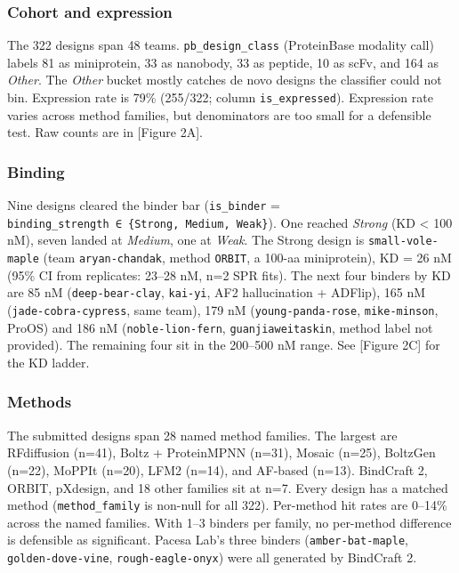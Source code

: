 \hypertarget{cohort-and-expression}{%
\subsubsection{Cohort and expression}\label{cohort-and-expression}}

The 322 designs span 48 teams. \texttt{pb\_design\_class} (ProteinBase
modality call) labels 81 as miniprotein, 33 as nanobody, 33 as peptide,
10 as scFv, and 164 as \emph{Other}. The \emph{Other} bucket mostly
catches de novo designs the classifier could not bin. Expression rate
is 79\% (255/322; column \texttt{is\_expressed}). Expression rate varies
across method families, but denominators are too small for a defensible
test. Raw counts are in {[}Figure 2A{]}.

\hypertarget{binding}{%
\subsubsection{Binding}\label{binding}}

Nine designs cleared the binder bar (\texttt{is\_binder} =
\texttt{binding\_strength\ ∈\ \{Strong,\ Medium,\ Weak\}}). One reached
\emph{Strong} (KD \textless{} 100 nM), seven landed at \emph{Medium},
one at \emph{Weak}. The Strong design is \texttt{small-vole-maple}
(team \texttt{aryan-chandak}, method \texttt{ORBIT}, a 100-aa
miniprotein), KD = 26 nM (95\% CI from replicates: 23--28 nM, n=2 SPR
fits). The next four binders by KD are 85 nM
(\texttt{deep-bear-clay}, \texttt{kai-yi}, AF2 hallucination + ADFlip),
165 nM (\texttt{jade-cobra-cypress}, same team), 179 nM
(\texttt{young-panda-rose}, \texttt{mike-minson}, ProOS) and 186 nM
(\texttt{noble-lion-fern}, \texttt{guanjiaweitaskin}, method label not
provided). The remaining four sit in the 200--500 nM range. See
{[}Figure 2C{]} for the KD ladder.

\hypertarget{methods}{%
\subsubsection{Methods}\label{methods}}

The submitted designs span 28 named method families. The largest are
RFdiffusion (n=41), Boltz + ProteinMPNN (n=31), Mosaic (n=25), BoltzGen
(n=22), MoPPIt (n=20), LFM2 (n=14), and AF-based (n=13). BindCraft 2,
ORBIT, pXdesign, and 18 other families sit at n=7. Every design has a
matched method (\texttt{method\_family} is non-null for all 322).
Per-method hit rates are 0--14\% across the named families. With 1--3
binders per family, no per-method difference is defensible as
significant. Pacesa Lab's three binders (\texttt{amber-bat-maple},
\texttt{golden-dove-vine}, \texttt{rough-eagle-onyx}) were all
generated by BindCraft 2.

